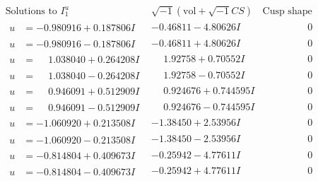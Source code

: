 \documentclass[1p]{elsarticle_modified}
\theoremstyle{definition}
\newcommand{\I}{\sqrt{-1}}
\begin{document}
$$\begin{array}{c|c|c}  
\text{Solutions to }I^u_{1}& \I (\text{vol} + \sqrt{-1}CS) & \text{Cusp shape}\\
 \hline 
\begin{aligned}
u &= -0.980916 + 0.187806 I\end{aligned}
 & -0.46811 - 4.80626 I & \phantom{-0.000000 } 0 \\ \hline\begin{aligned}
u &= -0.980916 - 0.187806 I\end{aligned}
 & -0.46811 + 4.80626 I & \phantom{-0.000000 } 0 \\ \hline\begin{aligned}
u &= \phantom{-}1.038040 + 0.264208 I\end{aligned}
 & \phantom{-}1.92758 + 0.70552 I & \phantom{-0.000000 } 0 \\ \hline\begin{aligned}
u &= \phantom{-}1.038040 - 0.264208 I\end{aligned}
 & \phantom{-}1.92758 - 0.70552 I & \phantom{-0.000000 } 0 \\ \hline\begin{aligned}
u &= \phantom{-}0.946091 + 0.512909 I\end{aligned}
 & \phantom{-}0.924676 + 0.744595 I & \phantom{-0.000000 } 0 \\ \hline\begin{aligned}
u &= \phantom{-}0.946091 - 0.512909 I\end{aligned}
 & \phantom{-}0.924676 - 0.744595 I & \phantom{-0.000000 } 0 \\ \hline\begin{aligned}
u &= -1.060920 + 0.213508 I\end{aligned}
 & -1.38450 + 2.53956 I & \phantom{-0.000000 } 0 \\ \hline\begin{aligned}
u &= -1.060920 - 0.213508 I\end{aligned}
 & -1.38450 - 2.53956 I & \phantom{-0.000000 } 0 \\ \hline\begin{aligned}
u &= -0.814804 + 0.409673 I\end{aligned}
 & -0.25942 - 4.77611 I & \phantom{-0.000000 } 0 \\ \hline\begin{aligned}
u &= -0.814804 - 0.409673 I\end{aligned}
 & -0.25942 + 4.77611 I & \phantom{-0.000000 } 0 \\ \hline\begin{aligned}

\end{aligned}
\end{array}$$
\end{document}
